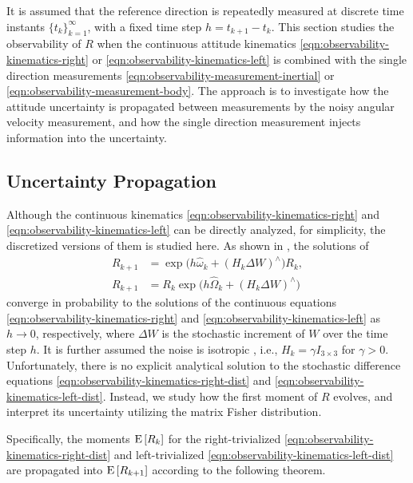 It is assumed that the reference direction is repeatedly measured at discrete time instants $\{t_k\}_{k=1}^\infty$, with a fixed time step $h = t_{k+1}-t_k$.
This section studies the observability of $R$ when the continuous attitude kinematics \eqref{eqn:observability-kinematics-right} or \eqref{eqn:observability-kinematics-left} is combined with the single direction measurements \eqref{eqn:observability-measurement-inertial} or \eqref{eqn:observability-measurement-body}.
The approach is to investigate how the attitude uncertainty is propagated between measurements by the noisy angular velocity measurement, and how the single direction measurement injects information into the uncertainty.

\subsection{Uncertainty Propagation} \label{section:observability-propagation}

Although the continuous kinematics \eqref{eqn:observability-kinematics-right} and \eqref{eqn:observability-kinematics-left} can be directly analyzed, for simplicity, the discretized versions of them is studied here.
As shown in \cite{barrau2018stochastic}, the solutions of
\begin{align}
	R_{k+1} &= \exp\!\big( h\hat{\omega}_k + (H_k\Delta W)^\wedge \big) R_k \label{eqn:observability-kinematics-right-dist}, \\
	R_{k+1} &= R_k \exp\!\big( h\hat{\Omega}_k + (H_k\Delta W)^\wedge \big) \label{eqn:observability-kinematics-left-dist}
\end{align}
converge in probability to the solutions of the continuous equations \eqref{eqn:observability-kinematics-right} and \eqref{eqn:observability-kinematics-left} as $h\to 0$, respectively, where $\Delta W$ is the stochastic increment of $W$ over the time step $h$.
It is further assumed the noise is isotropic \cite{barrau2018stochastic}, i.e., $H_k = \gamma I_{3\times 3}$ for $\gamma >0$.
Unfortunately, there is no explicit analytical solution to the stochastic difference equations \eqref{eqn:observability-kinematics-right-dist} and \eqref{eqn:observability-kinematics-left-dist}.
Instead, we study how the first moment of $R$ evolves, and interpret its uncertainty utilizing the matrix Fisher distribution.

Specifically, the moments $\mathrm{E}\left[ R_k \right]$ for the right-trivialized \eqref{eqn:observability-kinematics-right-dist} and left-trivialized \eqref{eqn:observability-kinematics-left-dist} are propagated into $\mathrm{E}\left[ R_{k+1} \right]$ according to the following theorem.

